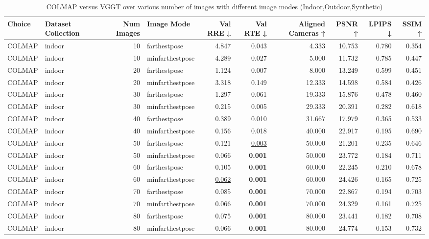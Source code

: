 \begin{table}[H]
\caption{\ifdefined\customcaption \customcaption \else COLMAP versus VGGT over various number of images with different image modes (Indoor,Outdoor,Synthetic) \fi}
\label{tab:01_num_images_image_mode_indoor,outdoor,synthetic}
\centering
\scriptsize
\begin{tabular}{llrlrrrrrr}
\toprule
Choice & Dataset Collection & Num Images & Image Mode & Val RRE ↓ & Val RTE ↓ & Aligned Cameras ↑ & PSNR ↑ & LPIPS ↓ & SSIM ↑ \\
\midrule
COLMAP & indoor & 10 & farthestpose & 4.847 & 0.043 & 4.333 & 10.753 & 0.780 & 0.354 \\
COLMAP & indoor & 10 & minfarthestpose & 4.289 & 0.027 & 5.000 & 11.732 & 0.785 & 0.447 \\
COLMAP & indoor & 20 & farthestpose & 1.124 & 0.007 & 8.000 & 13.249 & 0.599 & 0.451 \\
COLMAP & indoor & 20 & minfarthestpose & 3.318 & 0.149 & 12.333 & 14.598 & 0.584 & 0.426 \\
COLMAP & indoor & 30 & farthestpose & 1.297 & 0.061 & 19.333 & 15.876 & 0.478 & 0.460 \\
COLMAP & indoor & 30 & minfarthestpose & 0.215 & 0.005 & 29.333 & 20.391 & 0.282 & 0.618 \\
COLMAP & indoor & 40 & farthestpose & 0.389 & 0.010 & 31.667 & 17.979 & 0.365 & 0.533 \\
COLMAP & indoor & 40 & minfarthestpose & 0.156 & 0.018 & 40.000 & 22.917 & 0.195 & 0.690 \\
COLMAP & indoor & 50 & farthestpose & 0.121 & \underline{0.003} & 50.000 & 21.201 & 0.235 & 0.646 \\
COLMAP & indoor & 50 & minfarthestpose & 0.066 & \textbf{0.001} & 50.000 & 23.772 & 0.184 & 0.711 \\
COLMAP & indoor & 60 & farthestpose & 0.105 & \textbf{0.001} & 60.000 & 22.245 & 0.210 & 0.678 \\
COLMAP & indoor & 60 & minfarthestpose & \underline{0.062} & \textbf{0.001} & 60.000 & 24.426 & 0.165 & 0.725 \\
COLMAP & indoor & 70 & farthestpose & 0.085 & \textbf{0.001} & 70.000 & 22.867 & 0.194 & 0.703 \\
COLMAP & indoor & 70 & minfarthestpose & 0.066 & \textbf{0.001} & 70.000 & 24.329 & 0.161 & 0.725 \\
COLMAP & indoor & 80 & farthestpose & 0.075 & \textbf{0.001} & 80.000 & 23.441 & 0.182 & 0.708 \\
COLMAP & indoor & 80 & minfarthestpose & 0.066 & \textbf{0.001} & 80.000 & 24.774 & 0.153 & 0.732 \\

\end{tabular}
\end{table}
